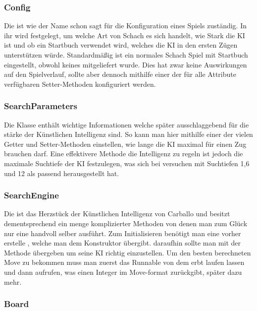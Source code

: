 \subsubsection{Config}

Die  ist wie der Name schon sagt für die Konfiguration eines Spiels 
zuständig. In ihr wird festgelegt, um welche Art von Schach es sich handelt, wie 
Stark die KI ist und ob ein Startbuch verwendet wird, welches die KI in den 
ersten Zügen unterstützen würde. Standardmäßig ist  ein normales Schach Spiel 
mit Startbuch eingestellt, obwohl keines mitgeliefert wurde. Dies hat zwar keine 
Auswirkungen auf den Spielverlauf, sollte aber dennoch mithilfe einer der für 
alle Attribute verfügbaren Setter-Methoden konfiguriert werden.

\subsubsection{SearchParameters}

Die Klasse  enthält wichtige Informationen welche später 
ausschlaggebend für die stärke der Künstlichen Intelligenz sind. So kann man 
hier mithilfe einer der vielen Getter und Setter-Methoden einstellen, wie lange 
die KI maximal für einen Zug brauchen darf. Eine effektivere Methode die 
Intelligenz zu regeln ist jedoch die maximale Suchtiefe der KI festzulegen, was 
sich bei versuchen mit Suchtiefen 1,6 und 12 als passend herausgestellt hat.

\subsubsection{SearchEngine}

Die  ist das Herzstück der Künstlichen Intelligenz von 
Carballo und besitzt dementsprechend ein menge komplizierter Methoden von denen 
man zum Glück nur eine handvoll selber ausführt. Zum Initialisieren benötigt man 
eine vorher erstelle , welche man dem Konstruktor übergibt. 
daraufhin sollte man  mit der 
Methode  übergeben um seine KI richtig 
einzustellen. Um den besten berechneten Move zu bekommen muss man zuerst das 
Runnable von dem  erbt laufen lassen und dann 
 aufrufen, was einen Integer im Move-format zurückgibt, 
später dazu mehr.

\subsubsection{Board}

